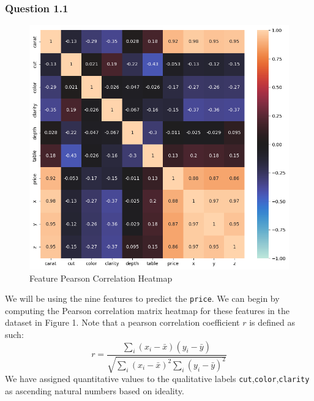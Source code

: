 \documentclass[11pt,letterpaper]{article}
\begin{document}

\subsubsection*{Question 1.1}
\begin{figure}[H]
    \centering
   \includegraphics[width=0.5\linewidth]{../Figures/Question-1/datasetCorrHeatmap.png}
   \caption{Feature Pearson Correlation Heatmap}
   \label{fig:corr_hm}
\end{figure}

We will be using the nine features to predict the \texttt{price}. We can begin by 
computing the Pearson correlation matrix heatmap for these features in 
the dataset in Figure 1. Note that a pearson correlation coefficient $r$ is 
defined as such:
\begin{equation}
r=\dfrac{\sum_i \left(x_i-\bar{x}\right)\left(y_i-\bar{y}\right)}{\sqrt{
\sum_i\left(x_i-\bar{x}\right)^2\sum_i\left(y_i-\bar{y}\right)^2
}}
\end{equation}
We have assigned quantitative values to
the qualitative labels \texttt{cut},\texttt{color},\texttt{clarity} as ascending 
natural numbers based on ideality.
\end{document}
